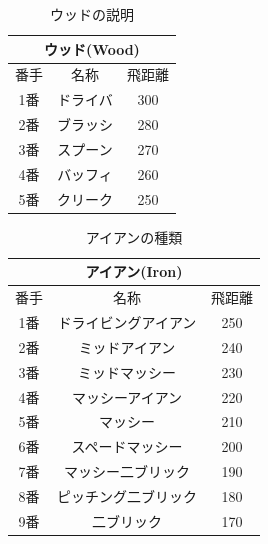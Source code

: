 \documentclass[a4j, twocolumn]{jarticle}
\begin{document}
\begin{table}[htbp]
    \centering
    \caption{ウッドの説明}
    \vspace{-10pt}
    \label{tab:data1}
\begin{tabular}{|c|c|c|} \hline
    \multicolumn{3}{|c|}{ウッド(Wood)} \\
    \hline
    \hline
    番手 & 名称 & 飛距離 \\ \hline
    1番 & ドライバ & 300 \\ \hline
    2番 & ブラッシ & 280 \\ \hline
    3番 & スプーン & 270 \\ \hline
    4番 & バッフィ & 260 \\ \hline
    5番 & クリーク & 250 \\ \hline
\end{tabular}
\end{table}

\begin{table}[htbp]
    \centering
    \caption{アイアンの種類}
    \vspace{-10pt}
    \label{tab:data2}
\begin{tabular}{|c|c|c|} \hline
    \multicolumn{3}{|c|}{アイアン(Iron)} \\
    \hline
    \hline
    番手 & 名称 & 飛距離 \\ \hline
    1番 & ドライビングアイアン & 250 \\ \hline
    2番 & ミッドアイアン & 240 \\ \hline
    3番 & ミッドマッシー & 230 \\ \hline
    4番 & マッシーアイアン & 220 \\ \hline
    5番 & マッシー & 210 \\ \hline
    6番 & スペードマッシー & 200 \\ \hline
    7番 & マッシー二ブリック & 190 \\ \hline
    8番 & ピッチング二ブリック & 180 \\ \hline
    9番 & 二ブリック & 170 \\ \hline
\end{tabular}
\end{table}
\end{document}
